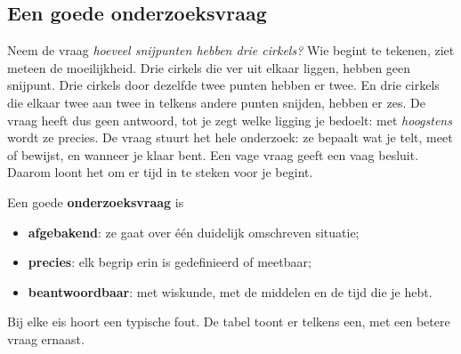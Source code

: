 \begin{oefeningen}
\end{oefeningen}

\subsection{Een goede onderzoeksvraag}

Neem de vraag \textit{hoeveel snijpunten hebben drie cirkels?} Wie begint te tekenen, ziet meteen de moeilijkheid. Drie cirkels die ver uit elkaar liggen, hebben geen snijpunt. Drie cirkels door dezelfde twee punten hebben er twee. En drie cirkels die elkaar twee aan twee in telkens andere punten snijden, hebben er zes. De vraag heeft dus geen antwoord, tot je zegt welke ligging je bedoelt: met \textit{hoogstens} wordt ze precies. De vraag stuurt het hele onderzoek: ze bepaalt wat je telt, meet of bewijst, en wanneer je klaar bent. Een vage vraag geeft een vaag besluit. Daarom loont het om er tijd in te steken voor je begint.

\begin{theorie}
Een goede \textbf{\textcolor{accent}{onderzoeksvraag}} is
\begin{itemize}
\item \textbf{afgebakend}: ze gaat over één duidelijk omschreven situatie;
\item \textbf{precies}: elk begrip erin is gedefinieerd of meetbaar;
\item \textbf{beantwoordbaar}: met wiskunde, met de middelen en de tijd die je hebt.
\end{itemize}
\end{theorie}

Bij elke eis hoort een typische fout. De tabel toont er telkens een, met een betere vraag ernaast.


